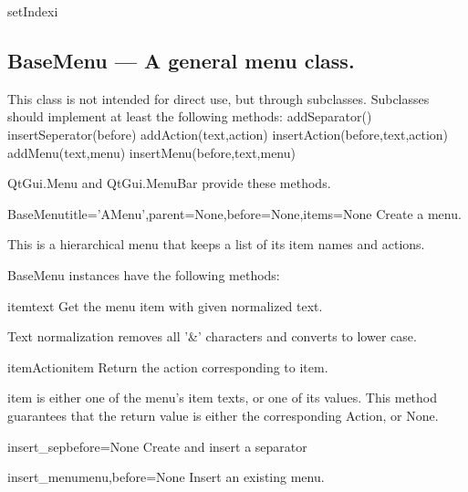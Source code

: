 \begin{funcdesc}{setIndex}{i}

\end{funcdesc}

\subsection{BaseMenu --- A general menu class.}
    This class is not intended for direct use, but through subclasses.
    Subclasses should implement at least the following methods:
      addSeparator()              insertSeperator(before)
      addAction(text,action)      insertAction(before,text,action)
      addMenu(text,menu)          insertMenu(before,text,menu)
      
    QtGui.Menu and QtGui.MenuBar provide these methods.
    

\begin{classdesc}{BaseMenu}{title='AMenu',parent=None,before=None,items=None}
Create a menu.

        This is a hierarchical menu that keeps a list of its item
        names and actions.
        
\end{classdesc}

BaseMenu instances have the following methods:

\begin{funcdesc}{item}{text}
Get the menu item with given normalized text.

        Text normalization removes all '\&' characters and
        converts to lower case.
        
\end{funcdesc}

\begin{funcdesc}{itemAction}{item}
Return the action corresponding to item.

        item is either one of the menu's item texts, or one of its
        values. This method guarantees that the return value is either the
        corresponding Action, or None.
        
\end{funcdesc}

\begin{funcdesc}{insert_sep}{before=None}
Create and insert a separator
\end{funcdesc}

\begin{funcdesc}{insert_menu}{menu,before=None}
Insert an existing menu.
\end{funcdesc}

